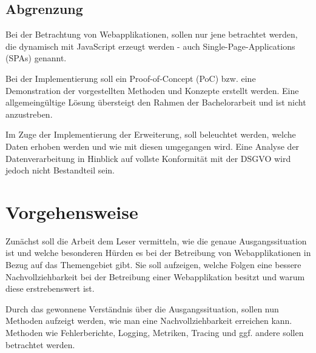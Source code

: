 \subsection{Abgrenzung}


Bei der Betrachtung von Webapplikationen, sollen nur jene betrachtet werden, die dynamisch mit JavaScript erzeugt werden - auch Single-Page-Applications (SPAs) genannt. 

Bei der Implementierung soll ein Proof-of-Concept (PoC) bzw. eine Demonstration der vorgestellten Methoden und Konzepte erstellt werden. Eine allgemeingültige Lösung übersteigt den Rahmen der Bachelorarbeit und ist nicht anzustreben.


Im Zuge der Implementierung der Erweiterung, soll beleuchtet werden, welche Daten erhoben werden und wie mit diesen umgegangen wird. Eine Analyse der Datenverarbeitung in Hinblick auf vollste Konformität mit der DSGVO wird jedoch nicht Bestandteil sein.

\pagebreak

\section{Vorgehensweise}

Zunächst soll die Arbeit dem Leser vermitteln, wie die genaue Ausgangssituation ist und welche besonderen Hürden es bei der Betreibung von Webapplikationen in Bezug auf das Themengebiet gibt. Sie soll aufzeigen, welche Folgen eine bessere Nachvollziehbarkeit bei der Betreibung einer Webapplikation besitzt und warum diese erstrebenswert ist.

Durch das gewonnene Verständnis über die Ausgangssituation, sollen nun Methoden aufzeigt werden, wie man eine Nachvollziehbarkeit erreichen kann. Methoden wie Fehlerberichte, Logging, Metriken, Tracing und ggf. andere sollen betrachtet werden.

